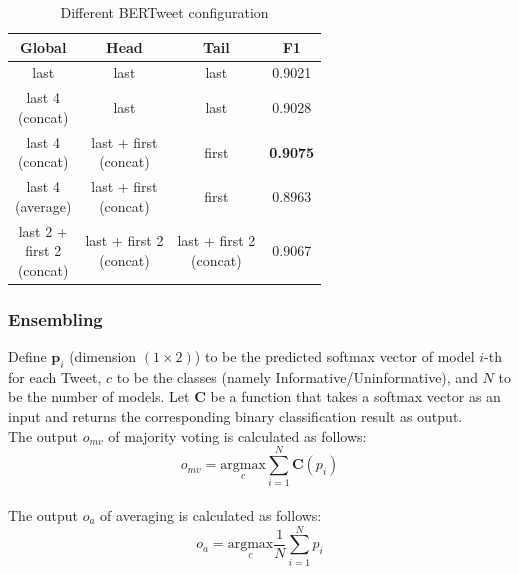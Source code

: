 \documentclass[11pt,a4paper]{article}
\begin{document}
\begin{table}[ht]
    \centering
    \fontsize{10}{10}\selectfont
    \begin{tabular}{|c|c|c|c|}
        \hline
        \bf{Global} & \bf{Head} & \bf{Tail} & \bf{F1} \\\hline
        last & last & last & 0.9021 \\\hline
        \makecell{last 4 \\ (concat)} & last & last & 0.9028 \\\hline
        \makecell{last 4 \\ (concat)} & \makecell{last + first\\ (concat)} & first & \textbf{0.9075} \\\hline
        \makecell{last 4 \\ (average)} & \makecell{last + first\\ (concat)} & first & 0.8963 \\\hline
        \makecell{last 2 + \\ first 2 \\ (concat)} & \makecell{last + first 2\\ (concat)} & \makecell{last + first 2\\ (concat)} & 0.9067 \\\hline
    \end{tabular}
    \caption{Different BERTweet configuration}
    \label{tab:my_label}
\end{table}

\subsubsection{Ensembling}
Define $\textbf{p}_i$ (dimension $(1 \times 2)$) to be the predicted softmax vector of model $i$-th for each Tweet, $c$ to be the classes (namely Informative/Uninformative), and $N$ to be the number of models. Let $\textbf{C}$ be a function that takes a softmax vector as an input and returns the corresponding binary classification result as output.\\
The output $o_{mv}$ of majority voting is calculated as follows:
\begin{equation}
    o_{mv} = \underset{c}{\text{argmax}} \sum_{i=1}^{N} \textbf{C}(p_i)  
\end{equation}\\
The output $o_{a}$ of averaging is calculated as follows:
\begin{equation}
    o_{a} = \underset{c}{\text{argmax}} \frac{1}{N} \sum_{i=1}^{N} p_i   
\end{equation}
\end{document}
